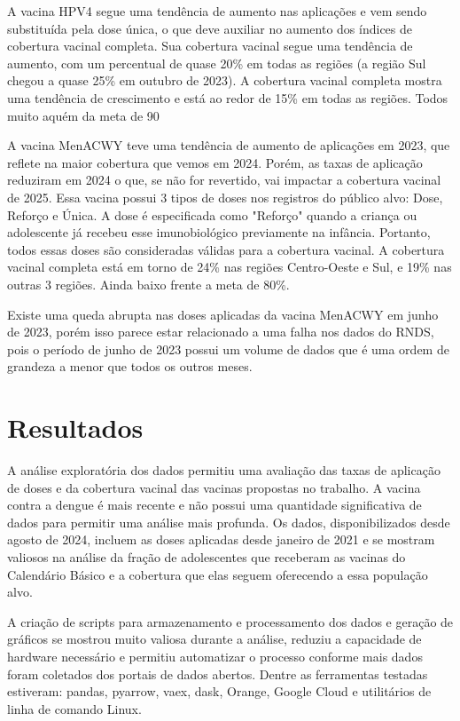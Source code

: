 \documentclass[12pt]{article}
\begin{document}
A vacina HPV4 segue uma tendência de aumento nas aplicações e vem sendo substituída pela dose única, o que deve auxiliar no aumento dos índices de cobertura vacinal completa. Sua cobertura vacinal segue uma tendência de aumento, com um percentual de quase 20\% em todas as regiões (a região Sul chegou a quase 25\% em outubro de 2023). A cobertura vacinal completa mostra uma tendência de crescimento e está ao redor de 15\% em todas as regiões. Todos muito aquém da meta de 90%

A vacina MenACWY teve uma tendência de aumento de aplicações em 2023, que reflete na maior cobertura que vemos em 2024. Porém, as taxas de aplicação reduziram em 2024 o que, se não for revertido, vai impactar a cobertura vacinal de 2025. Essa vacina possui 3 tipos de doses nos registros do público alvo: Dose, Reforço e Única. A dose é especificada como "Reforço" quando a criança ou adolescente já recebeu esse imunobiológico previamente na infância. Portanto, todos essas doses são consideradas válidas para a cobertura vacinal. A cobertura vacinal completa está em torno de 24\% nas regiões Centro-Oeste e Sul, e 19\% nas outras 3 regiões. Ainda baixo frente a meta de 80\%.

Existe uma queda abrupta nas doses aplicadas da vacina MenACWY em junho de 2023, porém isso parece estar relacionado a uma falha nos dados do RNDS, pois o período de junho de 2023 possui um volume de dados que é uma ordem de grandeza a menor que todos os outros meses.

\section{Resultados} \label{sec:resultados}
A análise exploratória dos dados permitiu uma avaliação das taxas de aplicação de doses e da cobertura vacinal das vacinas propostas no trabalho. A vacina contra a dengue é mais recente e não possui uma quantidade significativa de dados para permitir uma análise mais profunda. Os dados, disponibilizados desde agosto de 2024, incluem as doses aplicadas desde janeiro de 2021 e se mostram valiosos na análise da fração de adolescentes que receberam as vacinas do Calendário Básico e a cobertura que elas seguem oferecendo a essa população alvo.

A criação de scripts para armazenamento e processamento dos dados e geração de gráficos se mostrou muito valiosa durante a análise, reduziu a capacidade de hardware necessário e permitiu automatizar o processo conforme mais dados foram coletados dos portais de dados abertos. Dentre as ferramentas testadas estiveram: pandas, pyarrow, vaex, dask, Orange, Google Cloud e utilitários de linha de comando Linux.
\end{document}
